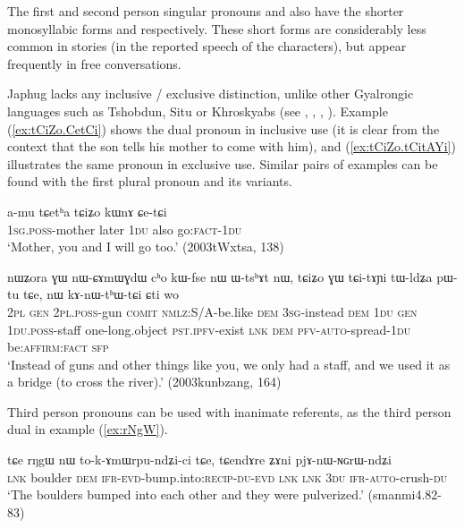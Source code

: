 The first and second person singular pronouns   and  also have the shorter monosyllabic forms  and  respectively. These short forms are considerably less common in stories (in the reported speech of the characters), but appear frequently in free conversations.

Japhug lacks any inclusive / exclusive distinction, unlike other Gyalrongic languages such as Tshobdun, Situ or Khroskyabs (see \citealt{jackson98morphology}, \citealt[177]{linxr93jiarongen}, \citealt[92]{prins16kyomkyo}, \citealt[170]{lai17khroskyabs}). Example  (\ref{ex:tCiZo.CetCi}) shows the dual pronoun  in inclusive use (it is clear from the context that the son tells his mother to come with him), and (\ref{ex:tCiZo.tCitAYi}) illustrates the same pronoun in exclusive use. Similar pairs of examples can be found with the first plural pronoun  and its variants.

\begin{exe}
\ex \label{ex:tCiZo.CetCi}
\gll a-mu tɕetʰa tɕiʑo kɯnɤ ɕe-tɕi \\
\textsc{1sg.poss}-mother later \textsc{1du} also go:\textsc{fact}-\textsc{1du} \\
\glt `Mother, you and I will go too.' (2003tWxtsa, 138)
\end{exe}

\begin{exe}
\ex \label{ex:tCiZo.tCitAYi}
\gll nɯʑora ɣɯ nɯ-ɕɤmɯɣdɯ cʰo kɯ-fse nɯ ɯ-tsʰɤt nɯ, tɕiʑo ɣɯ tɕi-tɤɲi tɯ-ldʑa pɯ-tu tɕe, nɯ kɤ-nɯ-tʰɯ-tɕi ɕti wo \\
\textsc{2pl} \textsc{gen} \textsc{2pl.poss}-gun \textsc{comit} \textsc{nmlz}:S/A-be.like \textsc{dem} \textsc{3sg}-instead \textsc{dem} \textsc{1du} \textsc{gen} \textsc{1du.poss}-staff one-long.object \textsc{pst.ipfv}-exist \textsc{lnk} \textsc{dem} \textsc{pfv}-\textsc{auto}-spread-\textsc{1du} be:\textsc{affirm}:\textsc{fact} \textsc{sfp} \\
\glt `Instead of guns and other things like you, we only had a staff, and we used it as a bridge (to cross the river).' (2003kunbzang, 164)
\end{exe}

Third person pronouns can be used with inanimate referents, as the third person dual  in example (\ref{ex:rNgW}).

\begin{exe}
\ex \label{ex:rNgW}
\gll tɕe   	rŋgɯ   	nɯ   	to-k-ɤmɯrpu-ndʑi-ci   	tɕe,   	tɕendɤre   	ʑɤni   	pjɤ-nɯ-ɴɢrɯ-ndʑi   \\
\textsc{lnk} boulder \textsc{dem} \textsc{ifr-evd}-bump.into:\textsc{recip}-\textsc{du-evd} \textsc{lnk} \textsc{lnk} \textsc{3du} \textsc{ifr-auto}-crush-\textsc{du} \\
\glt `The boulders bumped into each other and they were pulverized.' (smanmi4.82-83)
\end{exe}

